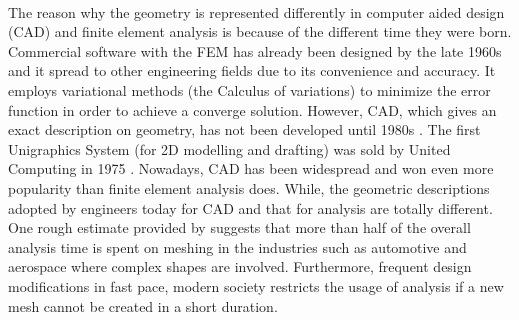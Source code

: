 \paragraph{}
The reason why the geometry is represented differently in computer aided design (CAD) and finite element analysis is because of the different time they were born.
Commercial software with the FEM has already been designed by the late 1960s and it spread to other engineering fields due to its convenience and accuracy.
It employs variational methods (the Calculus of variations) to minimize the error function in order to achieve a converge solution.
However, CAD, which gives an exact description on geometry, has not been developed until 1980s \citep{Dav2008}.
The first Unigraphics System (for 2D modelling and drafting) was sold by United Computing in 1975 \citep{Ste2010}.
Nowadays, CAD has been widespread and won even more popularity than finite element analysis does.
While, the geometric descriptions adopted by engineers today for CAD and that for analysis are totally different.
One rough estimate provided by \cite{Hug2005} suggests that more than half of the overall analysis time is spent on meshing in the industries such as automotive and aerospace where complex shapes are involved.
Furthermore, frequent design modifications in fast pace, modern society restricts the usage of analysis if a new mesh cannot be created in a short duration.

